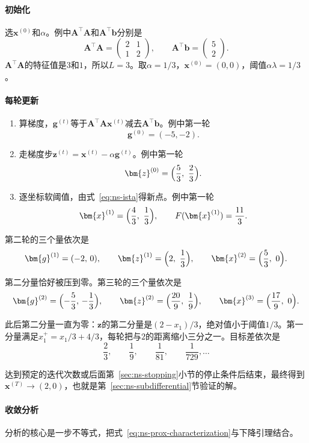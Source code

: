 \paragraph{初始化}
选$\bm{x}^{(0)}$和$\alpha$。例中$\bm{A}^\top\bm{A}$和$\bm{A}^\top\bm{b}$分别是
\[
 \bm{A}^\top\bm{A}=\begin{pmatrix}2&1\\1&2\end{pmatrix},\qquad\bm{A}^\top\bm{b}=\begin{pmatrix}5\\2\end{pmatrix}.
\]
$\bm{A}^\top\bm{A}$的特征值是$3$和$1$，所以$L=3$。取$\alpha=1/3$，$\bm{x}^{(0)}=(0,0)$，阈值$\alpha\lambda=1/3$。

\paragraph{每轮更新}
\begin{enumerate}
 \item 算梯度，$\bm{g}^{(t)}$等于$\bm{A}^\top\bm{A}\bm{x}^{(t)}$减去$\bm{A}^\top\bm{b}$。例中第一轮
 \[
  \bm{g}^{(0)}=(-5,-2).
 \]
 \item 走梯度步$\bm{z}^{(t)}=\bm{x}^{(t)}-\alpha\bm{g}^{(t)}$。例中第一轮
 \[
  \bm{z}^{(0)}=\Bigl(\frac53,\ \frac23\Bigr).
 \]
 \item 逐坐标软阈值，由式~\eqref{eq:ns-ista}得新点。例中第一轮
 \[
  \bm{x}^{(1)}=\Bigl(\frac43,\ \frac13\Bigr),\qquad F(\bm{x}^{(1)})=\frac{11}{3}.
 \]
\end{enumerate}

第二轮的三个量依次是
\[
 \bm{g}^{(1)}=(-2,\,0),\qquad\bm{z}^{(1)}=\Bigl(2,\ \frac13\Bigr),\qquad\bm{x}^{(2)}=\Bigl(\frac53,\ 0\Bigr).
\]

第二分量恰好被压到零。第三轮的三个量依次是
\[
 \bm{g}^{(2)}=\Bigl(-\frac53,\,-\frac13\Bigr),\qquad\bm{z}^{(2)}=\Bigl(\frac{20}{9},\ \frac19\Bigr),\qquad\bm{x}^{(3)}=\Bigl(\frac{17}{9},\ 0\Bigr).
\]

此后第二分量一直为零：$\bm{z}$的第二分量是$(2-x_1)/3$，绝对值小于阈值$1/3$。第一分量满足$x_1^{+}=x_1/3+4/3$，每轮把与$2$的距离缩小三分之一。目标差依次是
\[
 \frac23,\qquad\frac19,\qquad\frac{1}{81},\qquad\frac{1}{729},\ldots
\]

达到预定的迭代次数或后面第~\ref{sec:ns-stopping}小节的停止条件后结束，最终得到$\bm{x}^{(T)}\to(2,0)$，也就是第~\ref{sec:ns-subdifferential}节验证的解。

\paragraph{收敛分析}
分析的核心是一步不等式，把式~\eqref{eq:ns-prox-characterization}与下降引理结合。

